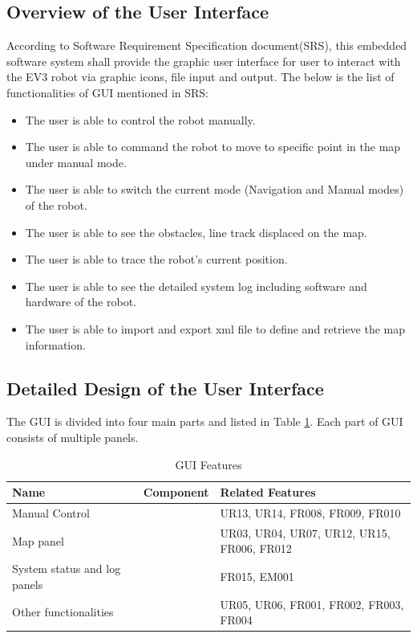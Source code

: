 \subsection{Overview of the User Interface}
According to Software Requirement Specification document(SRS), this embedded software system shall provide the graphic user interface for user to interact with the EV3 robot via graphic icons, file input and output. The below is the list of functionalities of GUI mentioned in SRS:
\begin{itemize}
	\item The user is able to control the robot manually.
	\item The user is able to command the robot to move to specific point in the map under manual mode.
	\item The user is able to switch the current mode (Navigation and Manual modes) of the robot.
	\item The user is able to see the obstacles, line track displaced on the map.
	\item The user is able to trace the robot's current position.
	\item The user is able to see the detailed system log including software and hardware of the robot.
	\item The user is able to import and export xml file to define and retrieve the map information.
\end{itemize}

\subsection{Detailed Design of the User Interface}
The GUI is divided into four main parts and listed in Table \ref{GUI Features}. Each part of GUI consists of multiple panels.

\begin{table}[]
	\centering
	\caption{GUI Features}
	\label{GUI Features}
	\begin{tabular}{|p{3cm}|p{2cm}|p{6cm}|}
		 \hline
		 Name & Component & Related Features \\ \hline
		 Manual Control &  & UR13, UR14, FR008, FR009, FR010 \\ \hline
		 Map panel  &  & UR03, UR04, UR07, UR12, UR15, FR006, FR012 \\ \hline
		 System status and log panels &  & FR015, EM001 \\ \hline
		 Other functionalities &  &  UR05, UR06, FR001, FR002, FR003, FR004 \\ \hline
	\end{tabular}
\end{table}

